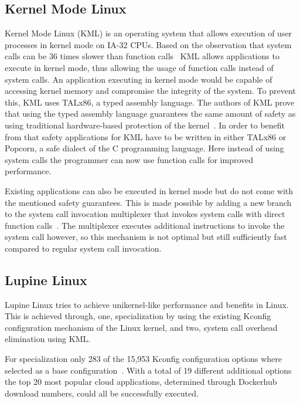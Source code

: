 \documentclass[10pt,twocolumn,a4paper]{article}
\begin{document}
  \subsection{Kernel Mode Linux}
    Kernel Mode Linux (KML) is an operating system that allows
    execution of user processes in kernel mode on IA-32 CPUs.
    Based on the observation that system calls can be 36 times slower
    than function calls~\cite{maeda2003} KML allows applications to execute in
    kernel mode, thus allowing the usage of function calls instead of system calls.
    An application executing in kernel mode would be capable of accessing kernel
    memory and compromise the integrity of the system.
    To prevent this, KML uses TALx86, a typed assembly language.
    The authors of KML prove that using the typed assembly language guarantees the 
    same amount of safety as using traditional hardware-based protection of the kernel~\cite{maeda2003}.
    In order to benefit from that safety applications for KML have to be written in
    either TALx86 or Popcorn, a safe dialect of the C programming language.
    Here instead of using system calls the programmer can now use function calls for improved performance.

    Existing applications can also be executed in kernel mode but do not come with
    the mentioned safety guarantees.
    This is made possible by adding a new branch to the system call invocation multiplexer
    that invokes system calls with direct function calls~\cite{maeda2003}.
    The multiplexer executes additional instructions to invoke the system call however, 
    so this mechanism is not optimal but still sufficiently fast compared to regular system call
    invocation.

  \subsection{Lupine Linux}
    Lupine Linux tries to achieve unikernel-like performance and benefits in Linux.
    This is achieved through, one, specialization by using the existing Kconfig 
    configuration mechanism of the Linux kernel, 
    and two, system call overhead elimination using KML.

    For specialization only 283 of the 15,953 Kconfig configuration options where
    selected as a base configuration~\cite{kuo20}.
    With a total of 19 different additional options the top 20 most popular cloud applications,
    determined through Dockerhub download numbers, could all be successfully executed.
\end{document}
